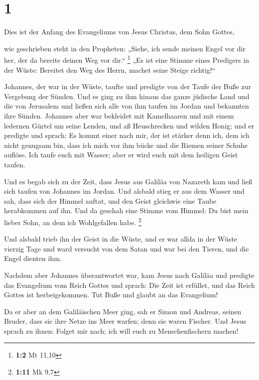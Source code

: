 \hypertarget{section}{%
\section{1}\label{section}}

 Dies ist der Anfang des Evangeliums von Jesus Christus,
dem Sohn Gottes,

 wie geschrieben steht in den Propheten: „Siehe, ich sende
meinen Engel vor dir her, der da bereite deinen Weg vor dir.``
\footnote{\textbf{1:2} Mt 11,10}  „Es ist eine Stimme
eines Predigers in der Wüste: Bereitet den Weg des Herrn, machet seine
Steige richtig!{}``

 Johannes, der war in der Wüste, taufte und predigte von
der Taufe der Buße zur Vergebung der Sünden.  Und es ging
zu ihm hinaus das ganze jüdische Land und die von Jerusalem und ließen
sich alle von ihm taufen im Jordan und bekannten ihre Sünden.
 Johannes aber war bekleidet mit Kamelhaaren und mit einem
ledernen Gürtel um seine Lenden, und aß Heuschrecken und wilden Honig;
 und er predigte und sprach: Es kommt einer nach mir, der
ist stärker denn ich, dem ich nicht genugsam bin, dass ich mich vor ihm
bücke und die Riemen seiner Schuhe auflöse.  Ich taufe
euch mit Wasser; aber er wird euch mit dem heiligen Geist taufen.

 Und es begab sich zu der Zeit, dass Jesus aus Galiläa von
Nazareth kam und ließ sich taufen von Johannes im Jordan.
 Und alsbald stieg er aus dem Wasser und sah, dass sich
der Himmel auftat, und den Geist gleichwie eine Taube herabkommen auf
ihn.  Und da geschah eine Stimme vom Himmel: Du bist mein
lieber Sohn, an dem ich Wohlgefallen habe. \footnote{\textbf{1:11} Mk
  9,7}

 Und alsbald trieb ihn der Geist in die Wüste,
 und er war allda in der Wüste vierzig Tage und ward
versucht von dem Satan und war bei den Tieren, und die Engel dienten
ihm.

 Nachdem aber Johannes überantwortet war, kam Jesus nach
Galiläa und predigte das Evangelium vom Reich Gottes  und
sprach: Die Zeit ist erfüllet, und das Reich Gottes ist herbeigekommen.
Tut Buße und glaubt an das Evangelium!

 Da er aber an dem Galiläischen Meer ging, sah er Simon
und Andreas, seinen Bruder, dass sie ihre Netze ins Meer warfen; denn
sie waren Fischer.  Und Jesus sprach zu ihnen: Folget mir
nach; ich will euch zu Menschenfischern machen!


